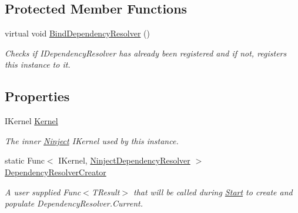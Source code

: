 \subsection*{Protected Member Functions}
\begin{DoxyCompactItemize}
\item 
virtual void \hyperlink{classCqrs_1_1Ninject_1_1Configuration_1_1NinjectDependencyResolver_a2b663d936fcded5f679623bf0b0393e6_a2b663d936fcded5f679623bf0b0393e6}{Bind\+Dependency\+Resolver} ()
\begin{DoxyCompactList}\small\item\em Checks if I\+Dependency\+Resolver has already been registered and if not, registers this instance to it. \end{DoxyCompactList}\end{DoxyCompactItemize}
\subsection*{Properties}
\begin{DoxyCompactItemize}
\item 
I\+Kernel \hyperlink{classCqrs_1_1Ninject_1_1Configuration_1_1NinjectDependencyResolver_a507ba37916f7e77cd5bbcc14543c03b5_a507ba37916f7e77cd5bbcc14543c03b5}{Kernel}
\begin{DoxyCompactList}\small\item\em The inner \hyperlink{namespaceCqrs_1_1Ninject}{Ninject} I\+Kernel used by this instance. \end{DoxyCompactList}\item 
static Func$<$ I\+Kernel, \hyperlink{classCqrs_1_1Ninject_1_1Configuration_1_1NinjectDependencyResolver}{Ninject\+Dependency\+Resolver} $>$ \hyperlink{classCqrs_1_1Ninject_1_1Configuration_1_1NinjectDependencyResolver_a11ea52beeb7420d21c99baeb3501aa0a_a11ea52beeb7420d21c99baeb3501aa0a}{Dependency\+Resolver\+Creator}
\begin{DoxyCompactList}\small\item\em A user supplied Func$<$\+T\+Result$>$ that will be called during \hyperlink{classCqrs_1_1Ninject_1_1Configuration_1_1NinjectDependencyResolver_adc6171ed45679dcbaa67782770ba5083_adc6171ed45679dcbaa67782770ba5083}{Start} to create and populate Dependency\+Resolver.\+Current. \end{DoxyCompactList}\end{DoxyCompactItemize}


